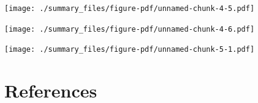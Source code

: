 \documentclass[
  letterpaper,
]{scrbook}
\newlength{\cslhangindent}
\newlength{\cslentryspacingunit} %
\newenvironment{CSLReferences}[2] %
 {%
  \setlength{\parindent}{0pt}
  \ifodd #1
  \let\oldpar\par
  \def\par{\hangindent=\cslhangindent\oldpar}
  \fi
  \setlength{\parskip}{#2\cslentryspacingunit}
 }%
 {}
\begin{document}
\texttt{[image: ./summary\_files/figure-pdf/unnamed-chunk-4-5.pdf]}

\texttt{[image: ./summary\_files/figure-pdf/unnamed-chunk-4-6.pdf]}

\texttt{[image: ./summary\_files/figure-pdf/unnamed-chunk-5-1.pdf]}


\hypertarget{references}{%
\chapter*{References}\label{references}}


\hypertarget{refs}{}
\begin{CSLReferences}{0}{0}
\end{CSLReferences}


\backmatter

\printindex
\end{document}
